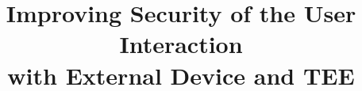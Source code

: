 

\graphicspath{{images/}}

\title[]{Improving Security of the User Interaction \\ with External Device and TEE} 



\maketitle
\thispagestyle{empty}












